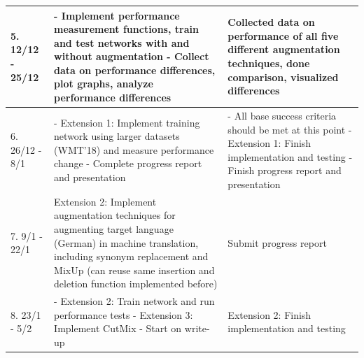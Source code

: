 \documentclass[60pt]{article}
\begin{document}
\begin{tabularx}{\textwidth}{|X|X|X|}
    \hline
    5. 12/12 - 25/12 &
    - Implement performance measurement functions, train and test networks with and without augmentation \newline
    - Collect data on performance differences, plot graphs, analyze performance differences & 
    Collected data on performance of all five different augmentation techniques, done comparison, visualized differences 
    \\ \hline 
    6. 26/12 - 8/1 & 
    - Extension 1: Implement training network using larger datasets (WMT’18) and measure performance change \newline
    - Complete progress report and presentation & 
    - All base success criteria should be met at this point \newline
    - Extension 1: Finish implementation and testing \newline
    - Finish progress report and presentation
    \\ \hline
    7. 9/1 - 22/1 & 
    Extension 2: Implement augmentation techniques for augmenting target language (German) in machine translation, including synonym replacement and MixUp (can reuse same insertion and deletion function implemented before) & 
    Submit progress report
    \\ \hline
    8. 23/1 - 5/2 &
    - Extension 2: Train network and run performance tests \newline
    - Extension 3: Implement CutMix \newline
    - Start on write-up &
    Extension 2: Finish implementation and testing
   \\ \hline
\end{tabularx}
\end{document}
